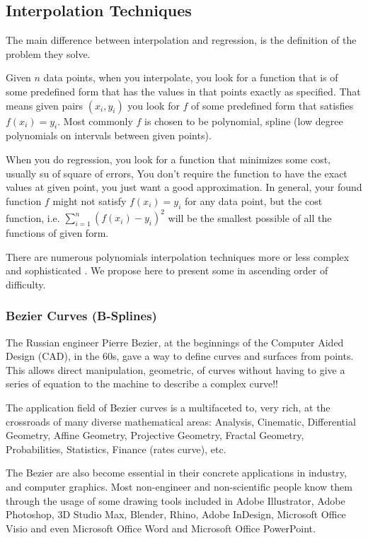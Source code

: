 	\pagebreak
	\subsection{Interpolation Techniques}
	The main difference between interpolation and regression, is the definition of the problem they solve.

	Given $n$ data points, when you interpolate, you look for a function that is of some predefined form that has the values in that points exactly as specified. That means given pairs $(x_i,y_i)$ you look for $f$ of some predefined form that satisfies $f(x_i)=y_i$. Most commonly $f$ is chosen to be polynomial, spline (low degree polynomials on intervals between given points).
	
	When you do regression, you look for a function that minimizes some cost, usually su of square of errors, You don't require the function to have the exact values at given point, you just want a good approximation. In general, your found function $f$ might not satisfy $f(x_i)=y_i$ for any data point, but the cost function, i.e. $\displaystyle\sum_{i=1}^n(f(x_i)-y_i)^2$ will be the smallest possible of all the functions of given form.
	
	There are numerous polynomials interpolation techniques more or less complex and sophisticated . We propose here to present some in ascending order of difficulty.
	
	\subsubsection{Bezier Curves (B-Splines)}
	The Russian engineer Pierre Bezier, at the beginnings of the Computer Aided Design (CAD), in the 60s, gave a way to define curves and surfaces from points. This allows direct manipulation, geometric, of curves without having to give a series of equation to the machine to describe a complex curve!!
	
	The application field of Bezier curves is a multifaceted to, very rich, at the crossroads of many diverse mathematical areas: Analysis, Cinematic, Differential Geometry,  Affine Geometry, Projective Geometry, Fractal Geometry, Probabilities, Statistics, Finance (rates curve), etc.
	
	The Bezier are also become essential in their concrete applications in industry, and computer graphics. Most non-engineer and non-scientific people know them through the usage of some drawing tools included in Adobe Illustrator, Adobe Photoshop, 3D Studio Max, Blender, Rhino, Adobe InDesign, Microsoft Office Visio and even Microsoft Office Word and Microsoft Office PowerPoint.
	
